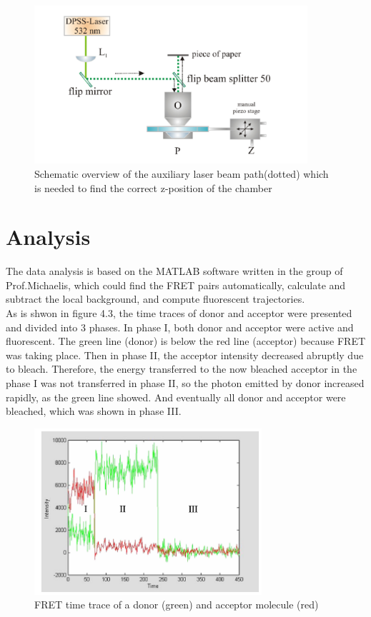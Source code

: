 \documentclass[a4paper,english,12pt,bibliography=totoc]{scrreprt}
\begin{document}
\begin{figure}
    \centering
    \includegraphics[width = 0.9\textwidth]{images/auxiliary laser beam.png}
    \caption{Schematic overview of the auxiliary laser beam path(dotted) which is needed to find the correct z-position of the chamber}
\end{figure}
\section{Analysis}
\label{sec:analysis} 
The data analysis is based on the MATLAB software written in the group of Prof.Michaelis, which could find the FRET pairs automatically, calculate and subtract the local background, and compute fluorescent trajectories\cite{smFRET_lab_script}. \\

As is shwon in figure 4.3, the time traces of donor and acceptor were presented and divided into 3 phases. In phase I, both donor and acceptor were active and fluorescent. The green line (donor) is below the red line (acceptor) because FRET was taking place. Then in phase II, the acceptor intensity decreased abruptly due to bleach. Therefore, the energy transferred to the now bleached acceptor in the phase I was not transferred in phase II, so the photon emitted by donor increased rapidly, as the green line showed. And eventually all donor and acceptor were bleached, which was shown in phase III.\\

\begin{figure}
    \centering
    \includegraphics[width = 0.75\textwidth]{images/3 phases.png}
    \caption{FRET time trace of a donor (green) and acceptor molecule (red)}
\end{figure}
\end{document}
